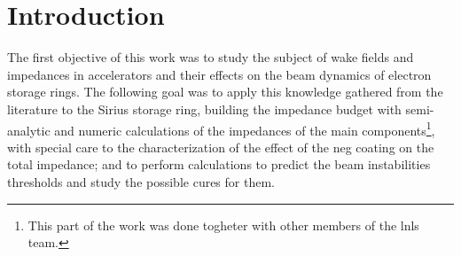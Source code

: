 
% 




% 


	\frenchspacing

	\pretextual
	

	\textual

\chapter{Introduction} \label{chap:intro}

    The first objective of this work was to study the subject of wake fields and impedances in accelerators and their effects on the beam dynamics of electron storage rings. The following goal was to apply this knowledge gathered from the literature to the Sirius storage ring, building the impedance budget with semi-analytic and numeric calculations of the impedances of the main components\footnote{This part of the work was done togheter with other members of the \gls{lnls} team.}, with special care to the characterization of the effect of the \gls{neg} coating on the total impedance; and to perform calculations to predict the beam instabilities thresholds and study the possible cures for them.

